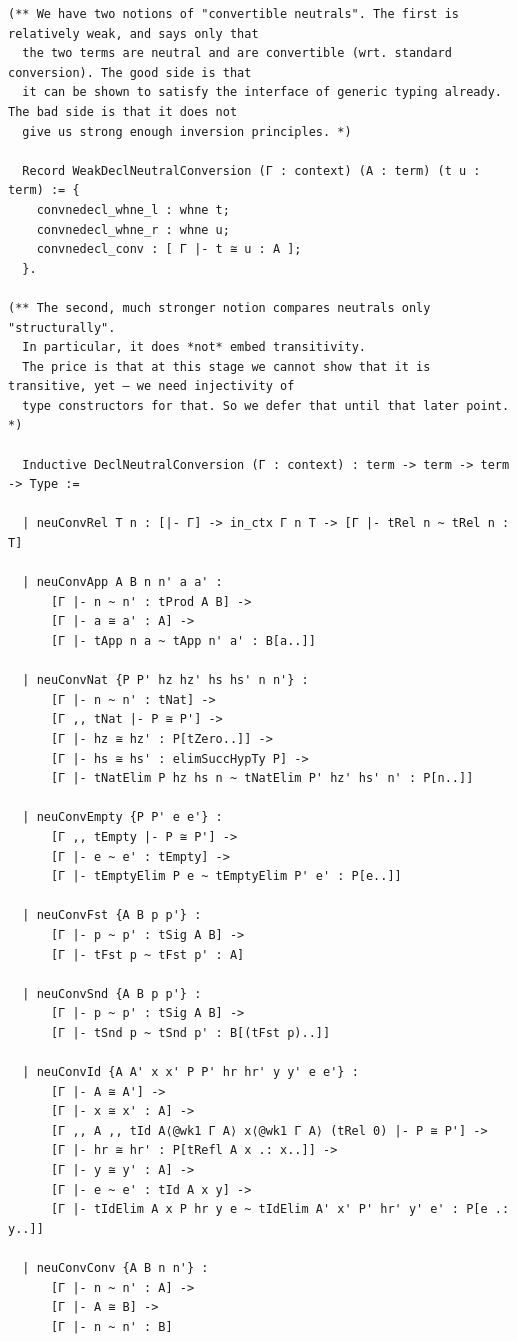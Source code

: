 \documentclass[10pt,a4paper]{amsart}
\begin{document}
\begin{lstlisting}
(** We have two notions of "convertible neutrals". The first is relatively weak, and says only that
  the two terms are neutral and are convertible (wrt. standard conversion). The good side is that
  it can be shown to satisfy the interface of generic typing already. The bad side is that it does not
  give us strong enough inversion principles. *)

  Record WeakDeclNeutralConversion (Γ : context) (A : term) (t u : term) := {
    convnedecl_whne_l : whne t;
    convnedecl_whne_r : whne u;
    convnedecl_conv : [ Γ |- t ≅ u : A ];
  }.

(** The second, much stronger notion compares neutrals only "structurally".
  In particular, it does *not* embed transitivity.
  The price is that at this stage we cannot show that it is transitive, yet – we need injectivity of
  type constructors for that. So we defer that until that later point. *)

  Inductive DeclNeutralConversion (Γ : context) : term -> term -> term -> Type :=

  | neuConvRel T n : [|- Γ] -> in_ctx Γ n T -> [Γ |- tRel n ~ tRel n : T]

  | neuConvApp A B n n' a a' :
      [Γ |- n ~ n' : tProd A B] ->
      [Γ |- a ≅ a' : A] ->
      [Γ |- tApp n a ~ tApp n' a' : B[a..]]

  | neuConvNat {P P' hz hz' hs hs' n n'} :
      [Γ |- n ~ n' : tNat] ->
      [Γ ,, tNat |- P ≅ P'] ->
      [Γ |- hz ≅ hz' : P[tZero..]] ->
      [Γ |- hs ≅ hs' : elimSuccHypTy P] ->
      [Γ |- tNatElim P hz hs n ~ tNatElim P' hz' hs' n' : P[n..]]

  | neuConvEmpty {P P' e e'} :
      [Γ ,, tEmpty |- P ≅ P'] ->
      [Γ |- e ~ e' : tEmpty] ->
      [Γ |- tEmptyElim P e ~ tEmptyElim P' e' : P[e..]]

  | neuConvFst {A B p p'} :
      [Γ |- p ~ p' : tSig A B] ->
      [Γ |- tFst p ~ tFst p' : A]

  | neuConvSnd {A B p p'} :
      [Γ |- p ~ p' : tSig A B] ->
      [Γ |- tSnd p ~ tSnd p' : B[(tFst p)..]]

  | neuConvId {A A' x x' P P' hr hr' y y' e e'} :
      [Γ |- A ≅ A'] ->
      [Γ |- x ≅ x' : A] ->
      [Γ ,, A ,, tId A⟨@wk1 Γ A⟩ x⟨@wk1 Γ A⟩ (tRel 0) |- P ≅ P'] ->
      [Γ |- hr ≅ hr' : P[tRefl A x .: x..]] ->
      [Γ |- y ≅ y' : A] ->
      [Γ |- e ~ e' : tId A x y] ->
      [Γ |- tIdElim A x P hr y e ~ tIdElim A' x' P' hr' y' e' : P[e .: y..]]

  | neuConvConv {A B n n'} :
      [Γ |- n ~ n' : A] ->
      [Γ |- A ≅ B] ->
      [Γ |- n ~ n' : B]


\end{lstlisting}
\end{document}
